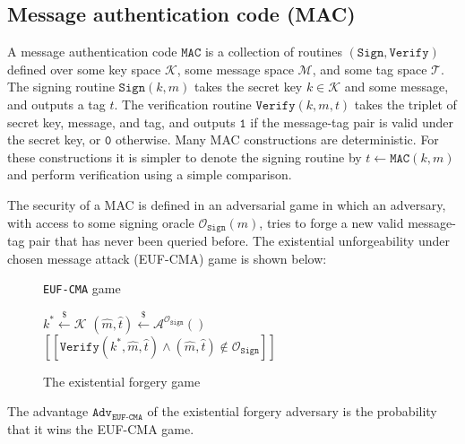 \documentclass[journal=tches,submission]{iacrtrans}
\newcommand{\mac}{\texttt{MAC}}
\newcommand{\sign}{\texttt{Sign}}
\newcommand{\verify}{\texttt{Verify}}
\newcommand{\leftsample}{\stackrel{\$}{\leftarrow}}
\newcommand{\llbrack}{[\![}
\newcommand{\rrbrack}{]\!]}
\newcommand{\adv}{\texttt{Adv}}
\begin{document}
\subsection{Message authentication code (MAC)}\label{sec:message-authentication-code}
A message authentication code $\mac$ is a collection of routines $(\sign, \verify)$ defined over some key space $\mathcal{K}$, some message space $\mathcal{M}$, and some tag space $\mathcal{T}$. The signing routine $\sign(k, m)$ takes the secret key $k \in \mathcal{K}$ and some message, and outputs a tag $t$. The verification routine $\verify(k, m, t)$ takes the triplet of secret key, message, and tag, and outputs $\texttt{1}$ if the message-tag pair is valid under the secret key, or $\texttt{0}$ otherwise. Many MAC constructions are deterministic. For these constructions it is simpler to denote the signing routine by $t \leftarrow \mac(k, m)$ and perform verification using a simple comparison.

The security of a MAC is defined in an adversarial game in which an adversary, with access to some signing oracle $\mathcal{O}_\sign(m)$, tries to forge a new valid message-tag pair that has never been queried before. The existential unforgeability under chosen message attack (EUF-CMA) game is shown below:

\begin{figure}[H]
    \centering
    \begin{minipage}{0.7\textwidth}
        \begin{algorithm}[H]
            \caption*{\texttt{EUF-CMA} game}

            \begin{algorithmic}[1]
                \State $k^\ast \leftsample \mathcal{K}$
                \State $(\hat{m}, \hat{t}) \leftsample \mathcal{A}^{\mathcal{O}_\sign}()$
                \State \Return $
                    \llbrack \verify(k^\ast, \hat{m}, \hat{t}) 
                    \land (\hat{m}, \hat{t}) \not\in \mathcal{O}_\sign
                    \rrbrack
                $
            \end{algorithmic}
        \end{algorithm}
    \end{minipage}
    \caption{The existential forgery game}\label{fig:euf-cma-game}
\end{figure}

The advantage $\adv_\texttt{EUF-CMA}$ of the existential forgery adversary is the probability that it wins the EUF-CMA game.
\end{document}
